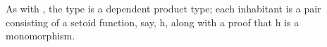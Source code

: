 \begin{code}%
\>[0]\<%
\\
\>[0][@{}l@{\AgdaIndent{1}}]%
\>[1]\AgdaSpace{}%
\AgdaSpace{}%
\AgdaSymbol{(}\AgdaSpace{}%
\AgdaSymbol{:}\AgdaSpace{}%
\AgdaOperator{\AgdaFunction{𝔻[}}\AgdaSpace{}%
\AgdaSpace{}%
\AgdaOperator{\AgdaFunction{]}}\AgdaSpace{}%
\AgdaSpace{}%
\AgdaOperator{\AgdaFunction{𝔻[}}\AgdaSpace{}%
\AgdaSpace{}%
\AgdaOperator{\AgdaFunction{]}}\AgdaSymbol{)}\AgdaSpace{}%
\AgdaSymbol{:}\AgdaSpace{}%
\AgdaSpace{}%
\AgdaSymbol{(}\AgdaSpace{}%
\AgdaSpace{}%
\AgdaSpace{}%
\AgdaSpace{}%
\AgdaSpace{}%
\AgdaSpace{}%
\AgdaSpace{}%
\AgdaSpace{}%
\AgdaSymbol{)}\AgdaSpace{}%
\<%
\\
\>[1][@{}l@{\AgdaIndent{0}}]%
\>[2]%
\>[9]\AgdaSpace{}%
\AgdaSymbol{:}\AgdaSpace{}%
\AgdaSpace{}%
\<%
\\
%
\>[9]\AgdaSpace{}%
\AgdaSymbol{:}\AgdaSpace{}%
\AgdaSpace{}%
\<%
\\
%
\\[\AgdaEmptyExtraSkip]%
%
\>[2]\AgdaSpace{}%
\AgdaSymbol{:}\AgdaSpace{}%
\<%
\\
%
\>[2]\AgdaSpace{}%
\AgdaSymbol{=}\AgdaSpace{}%
\AgdaSpace{}%
\AgdaOperator{\AgdaInductiveConstructor{,}}\AgdaSpace{}%
\<%
\\
%
\\[\AgdaEmptyExtraSkip]%
%
\>[1]\AgdaSpace{}%
\AgdaSymbol{:}\AgdaSpace{}%
\AgdaSpace{}%
\AgdaSymbol{\AgdaUnderscore{}}\<%
\\
%
\>[1]\AgdaSpace{}%
\AgdaSymbol{=}\AgdaSpace{}%
\AgdaSpace{}%
\AgdaSymbol{(}\AgdaOperator{\AgdaFunction{𝔻[}}\AgdaSpace{}%
\AgdaSpace{}%
\AgdaOperator{\AgdaFunction{]}}\AgdaSpace{}%
\AgdaSpace{}%
\AgdaOperator{\AgdaFunction{𝔻[}}\AgdaSpace{}%
\AgdaSpace{}%
\AgdaOperator{\AgdaFunction{]}}\AgdaSymbol{)}\AgdaSpace{}%
\<%
\\
\>[0]\<%
\end{code}
As with , the type  is a dependent product type; each inhabitant is a pair
consisting of a setoid function, say, \ab h, along with a proof that \ab h is a
monomorphism.

